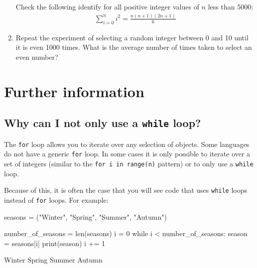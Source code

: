 \begin{enumerate}
Check the following identify for all positive integer values of \(n\) less than
5000:
\begin{equation*}
\begin{split}
       \sum_{i=0}^n i^2=\frac{n(n+1)(2n+1)}{6}
   \end{split}
\end{equation*}
\item 

Repeat the experiment of selecting a random integer between 0 and 10 until it
is even 1000 times.
What is the average number of times taken to select an even number?

\end{enumerate}
\section{Further information}
\label{\detokenize{building-tools/01-variables-conditionals-loops/why/main:further-information}}\label{\detokenize{building-tools/01-variables-conditionals-loops/why/main::doc}}

\subsection{Why can I not only use a \texttt{while} loop?}

The \texttt{for} loop allows you to iterate over any selection of objects. Some
languages do not have a generic \texttt{for} loop. In some cases it is only
possible to iterate over a set of integers (similar to the \texttt{for i in range(n)}
pattern) or to only use a \texttt{while} loop.


Because of this, it is often the case that you will see code that uses \texttt{while}
loops instead of \texttt{for} loops. For example:




\begin{pyin}
seasons = ("Winter", "Spring", "Summer", "Autumn")

number_of_seasons = len(seasons)
i = 0
while i < number_of_seasons:
    season = seasons[i]
    print(season)
    i += 1
\end{pyin}





\begin{raw}
Winter
Spring
Summer
Autumn
\end{raw}





